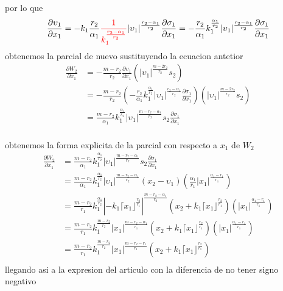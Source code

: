  por lo que 
 \begin{equation}
   \frac{\partial \upsilon_1}{\partial x_1}= -k_1 \frac{r_2}{\alpha_1} \textcolor{red}{\frac{1}{k_1^{\frac{r_2-\alpha_1}{r_2}}}} |\upsilon_1|^{\frac{r_2-\alpha_1}{r_2}} \frac{\partial \sigma_1}{\partial x_1}= -\frac{r_2}{\alpha_1} k_1^{\frac{\alpha_1}{r_2}} |\upsilon_1|^{\frac{r_2-\alpha_1}{r_2}} \frac{\partial \sigma_1}{\partial x_1}
\end{equation}
obtenemos la parcial de nuevo sustituyendo la ecuacion antetior
\begin{equation}
 \begin{split}
      \frac{\partial W_2}{\partial x_1}&=-\frac{m-r_2}{r_2} \frac{\partial \upsilon_1}{\partial x_1} \left( |\upsilon_1|^{\frac{m-2r_2}{r_2}}s_2 \right)\\
      &=-\frac{m-r_2}{r_2} \left(  -\frac{r_2}{\alpha_1} k_1^{\frac{\alpha_1}{r_2}} |\upsilon_1|^{\frac{r_2-\alpha_1}{r_2}} \frac{\partial \sigma_1}{\partial x_1} \right) \left( |\upsilon_1|^{\frac{m-2r_2}{r_2}}s_2 \right)\\
      &=\frac{m-r_2}{\alpha_1} k_1^{\frac{\alpha_1}{r_2}}  |\upsilon_1|^{\frac{m-r_2-\alpha_1}{r_2}}  s_2 \frac{\partial \sigma_1}{\partial x_1} \\
 \end{split}
\end{equation}

obtenemos la forma explicita de la parcial con respecto a $x_1$ de $W_2$
\begin{equation}
  \begin{split}
       \frac{\partial W_2}{\partial x_1}&=\frac{m-r_2}{\alpha_1} k_1^{\frac{\alpha_1}{r_2}}  |\upsilon_1|^{\frac{m-r_2-\alpha_1}{r_2}}  s_2 \frac{\partial \sigma_1}{\partial x_1} \\
       &=\frac{m-r_2}{\alpha_1} k_1^{\frac{\alpha_1}{r_2}}  |\upsilon_1|^{\frac{m-r_2-\alpha_1}{r_2}}  \left(x_2 -\upsilon_1 \right) \left(\frac{\alpha_1}{r_1} |x_1|^{\frac{\alpha_1-r_1}{r_1}}\right) \\
       &=\frac{m-r_2}{r_1} k_1^{\frac{\alpha_1}{r_2}}  |-k_1\lceil x_1 \rfloor^{\frac{r_2}{r_1}}|^{\frac{m-r_2-\alpha_1}{r_2}}  \left(x_2 +k_1\lceil x_1 \rfloor^{\frac{r_2}{r_1}} \right) \left( |x_1|^{\frac{\alpha_1-r_1}{r_1}}\right) \\
       &=\frac{m-r_2}{r_1} k_1^{\frac{m-r_2}{r_2}}  | x_1|^{\frac{m-r_2-\alpha_1}{r_1}}  \left(x_2 +k_1\lceil x_1 \rfloor^{\frac{r_2}{r_1}} \right) \left( |x_1|^{\frac{\alpha_1-r_1}{r_1}}\right) \\
       &=\frac{m-r_2}{r_1} k_1^{\frac{m-r_2}{r_2}}  | x_1|^{\frac{m-r_2-r_1}{r_1}}  \left(x_2 +k_1\lceil x_1 \rfloor^{\frac{r_2}{r_1}} \right) \\
  \end{split}
\end{equation}
llegando asi  a la expresion del articulo con la diferencia de no tener signo negativo


